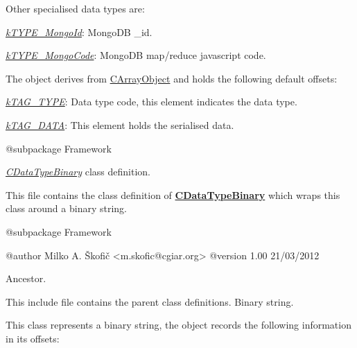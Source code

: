 Other specialised data types are\-:


\begin{DoxyItemize}
\item {\itshape \hyperlink{}{k\-T\-Y\-P\-E\-\_\-\-Mongo\-Id}}\-: Mongo\-D\-B \-\_\-id. 
\item {\itshape \hyperlink{}{k\-T\-Y\-P\-E\-\_\-\-Mongo\-Code}}\-: Mongo\-D\-B map/reduce javascript code. 
\end{DoxyItemize}

The object derives from \hyperlink{class_c_array_object}{C\-Array\-Object} and holds the following default offsets\-:


\begin{DoxyItemize}
\item {\itshape \hyperlink{}{k\-T\-A\-G\-\_\-\-T\-Y\-P\-E}}\-: Data type code, this element indicates the data type. 
\item {\itshape \hyperlink{}{k\-T\-A\-G\-\_\-\-D\-A\-T\-A}}\-: This element holds the serialised data. 
\end{DoxyItemize}

\begin{DoxyVerb}    @subpackage     Framework\end{DoxyVerb}


{\itshape \hyperlink{class_c_data_type_binary}{C\-Data\-Type\-Binary}} class definition.

This file contains the class definition of {\bfseries \hyperlink{class_c_data_type_binary}{C\-Data\-Type\-Binary}} which wraps this class around a binary string.

\begin{DoxyVerb}    @subpackage     Framework

    @author         Milko A. Škofič <m.skofic@cgiar.org>
    @version        1.00 21/03/2012\end{DoxyVerb}


Ancestor.

This include file contains the parent class definitions. Binary string.

This class represents a binary string, the object records the following information in its offsets\-:


